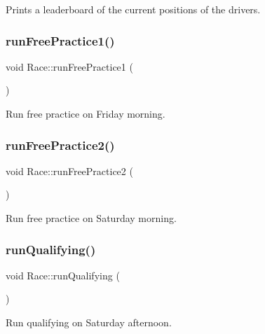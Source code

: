 Prints a leaderboard of the current positions of the drivers. \mbox{\label{classRace_a0f2422e16378be067631eaa7c370e09c}} 
\subsubsection{\texorpdfstring{run\+Free\+Practice1()}{runFreePractice1()}}
{\footnotesize\ttfamily void Race\+::run\+Free\+Practice1 (\begin{DoxyParamCaption}{ }\end{DoxyParamCaption})\hspace{0.3cm}{\ttfamily [private]}}

Run free practice on Friday morning. \mbox{\label{classRace_a5a4e8d13d043114b2260e297b2f00b0c}} 
\subsubsection{\texorpdfstring{run\+Free\+Practice2()}{runFreePractice2()}}
{\footnotesize\ttfamily void Race\+::run\+Free\+Practice2 (\begin{DoxyParamCaption}{ }\end{DoxyParamCaption})\hspace{0.3cm}{\ttfamily [private]}}

Run free practice on Saturday morning. \mbox{\label{classRace_ad10dda455090692cb7fc05cd5fdf66aa}} 
\subsubsection{\texorpdfstring{run\+Qualifying()}{runQualifying()}}
{\footnotesize\ttfamily void Race\+::run\+Qualifying (\begin{DoxyParamCaption}{ }\end{DoxyParamCaption})\hspace{0.3cm}{\ttfamily [private]}}

Run qualifying on Saturday afternoon. \mbox{\label{classRace_a753f045468dd1c6db5ed2aa1e0202cf1}} 
